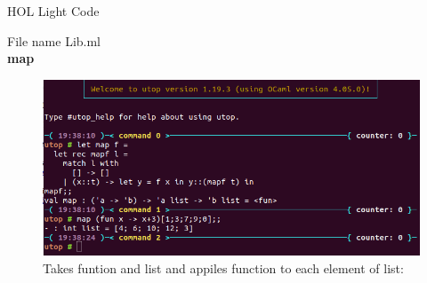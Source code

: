 \documentclass[15]{article}
\begin{document}
HOL Light Code 

File name Lib.ml\\

\textbf{map}
\begin{figure}

\includegraphics[scale = .5]{images/image4.png}
Takes funtion and list and appiles function to each element of list:
\\
\\


\end{figure}
\end{document}

